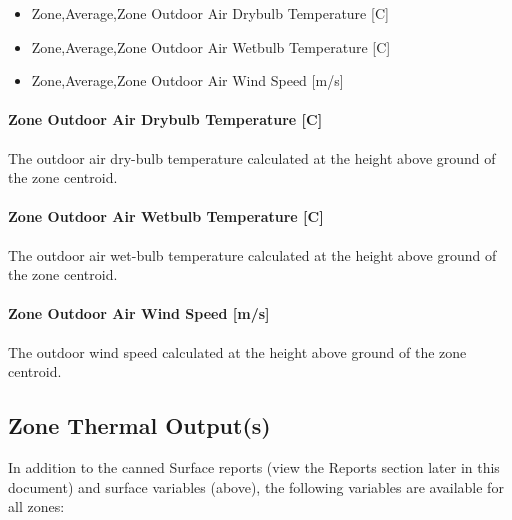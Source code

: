 \begin{itemize}
\item
  Zone,Average,Zone Outdoor Air Drybulb Temperature {[}C{]}
\item
  Zone,Average,Zone Outdoor Air Wetbulb Temperature {[}C{]}
\item
  Zone,Average,Zone Outdoor Air Wind Speed {[}m/s{]}
\end{itemize}

\paragraph{Zone Outdoor Air Drybulb Temperature {[}C{]}}\label{zone-outdoor-air-drybulb-temperature-c-000}

The outdoor air dry-bulb temperature calculated at the height above ground of the zone centroid.

\paragraph{Zone Outdoor Air Wetbulb Temperature {[}C{]}}\label{zone-outdoor-air-wetbulb-temperature-c-000}

The outdoor air wet-bulb temperature calculated at the height above ground of the zone centroid.

\paragraph{Zone Outdoor Air Wind Speed {[}m/s{]}}\label{zone-outdoor-air-wind-speed-ms-000}

The outdoor wind speed calculated at the height above ground of the zone centroid.

\subsection{Zone Thermal Output(s)}\label{zone-thermal-outputs}

In addition to the canned Surface reports (view the Reports section later in this document) and surface variables (above), the following variables are available for all zones:

